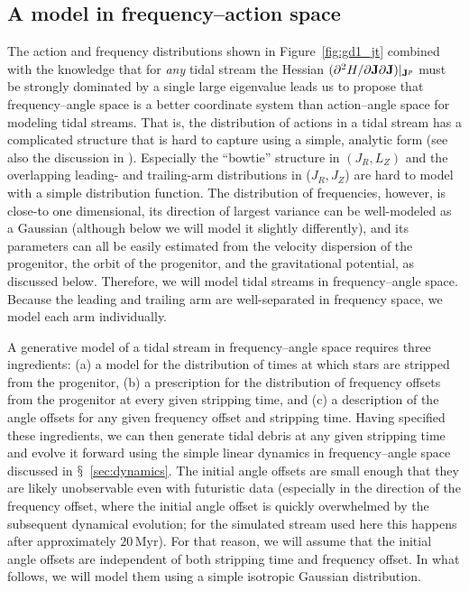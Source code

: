\documentclass[12pt,preprint]{aastex}
\renewcommand{\figurename}{Figure}
\newcommand{\sectionname}{$\mathsection$}
\renewcommand{\vec}[1]{\ensuremath{\mathbf{#1}}}
\newcommand{\vecj}{\ensuremath{\vec{J}}}
\newcommand{\Myr}{\ensuremath{\,\mathrm{Myr}}}
\begin{document}
\subsection{A model in frequency--action space}\label{sec:modeloa}

The action and frequency distributions shown in
\figurename~\ref{fig:gd1_jt} combined with the knowledge that for
\emph{any} tidal stream the Hessian $(\partial^2 H / \partial \vecj
\partial \vecj)\large|_{\vecj^p}$ must be strongly dominated by a
single large eigenvalue leads us to propose that frequency--angle
space is a better coordinate system than action--angle space for
modeling tidal streams. That is, the distribution of actions in a
tidal stream has a complicated structure that is hard to capture using
a simple, analytic form (see also the discussion in
\citealt{Eyre11a}). Especially the ``bowtie'' structure in $(J_R,L_Z)$
and the overlapping leading- and trailing-arm distributions in
($J_R,J_Z$) are hard to model with a simple distribution function. The
distribution of frequencies, however, is close-to one dimensional, its
direction of largest variance can be well-modeled as a Gaussian
(although below we will model it slightly differently), and its
parameters can all be easily estimated from the velocity dispersion of
the progenitor, the orbit of the progenitor, and the gravitational
potential, as discussed below. Therefore, we will model tidal streams
in frequency--angle space. Because the leading and trailing arm are
well-separated in frequency space, we model each arm individually.

A generative model of a tidal stream in frequency--angle space
requires three ingredients: (a) a model for the distribution of times
at which stars are stripped from the progenitor, (b) a prescription
for the distribution of frequency offsets from the progenitor at every
given stripping time, and (c) a description of the angle offsets for
any given frequency offset and stripping time. Having specified these
ingredients, we can then generate tidal debris at any given stripping
time and evolve it forward using the simple linear dynamics in
frequency--angle space discussed in
\sectionname~\ref{sec:dynamics}. The initial angle offsets are small
enough that they are likely unobservable even with futuristic data
(especially in the direction of the frequency offset, where the
initial angle offset is quickly overwhelmed by the subsequent
dynamical evolution; for the simulated stream used here this happens
after approximately $20\Myr$). For that reason, we will assume that
the initial angle offsets are independent of both stripping time and
frequency offset. In what follows, we will model them using a simple
isotropic Gaussian distribution.
\end{document}

